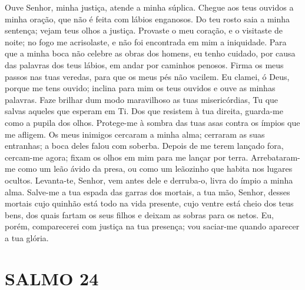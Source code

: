 \documentclass{subfiles}
\begin{document}
Ouve Senhor, minha justiça, atende a minha súplica. Chegue aos teus
ouvidos a minha oração, que não é feita com lábios enganosos. Do teu rosto
saia a minha sentença; vejam teus olhos a justiça. Provaste o meu coração, e
o visitaste de noite; no fogo me acrisolaste, e não foi encontrada em mim a
iniquidade. Para que a minha boca não celebre as obras dos homens, eu tenho
cuidado, por causa das palavras dos teus lábios, em andar por caminhos
penosos. Firma os meus passos nas tuas veredas, para que os meus pés não
vacilem. Eu clamei, ó Deus, porque me tens ouvido; inclina para mim os teus
ouvidos e ouve as minhas palavras. Faze brilhar dum modo maravilhoso as tuas
misericórdias, Tu que salvas aqueles que esperam em Ti. Dos que resistem à
tua direita, guarda-me como a pupila dos olhos. Protege-me à sombra das tuas
asas contra os ímpios que me afligem. Os meus inimigos cercaram a minha
alma; cerraram as suas entranhas; a boca deles falou com soberba. Depois de
me terem lançado fora, cercam-me agora; fixam os olhos em mim para me
lançar por terra. Arrebataram-me como um leão ávido da presa, ou como um
leãozinho que habita nos lugares ocultos. Levanta-te, Senhor, vem antes dele
e derruba-o, livra do ímpio a minha alma. Salve-me a tua espada das garras dos
mortais, a tua mão, Senhor, desses mortais cujo quinhão está todo na vida
presente, cujo ventre está cheio dos teus bens, dos quais fartam os seus filhos
e deixam as sobras para os netos. Eu, porém, comparecerei com justiça na tua
presença; vou saciar-me quando aparecer a tua glória.

\section*{SALMO 24}
\end{document}

